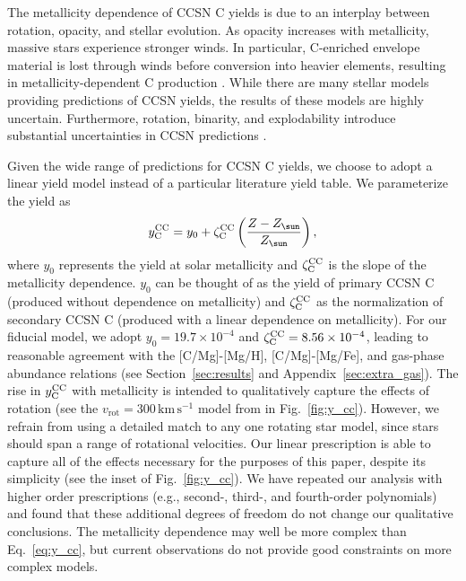 \documentclass[fleqn,
usenatbib]{mnras}
\newcommand{\caah}{[C/Mg]-[Mg/H]}
\newcommand{\caafe}{[C/Mg]-[Mg/Fe]}
\newcommand{\Ycc}{{y_{\rm C}^{\rm CC}}}
\newcommand{\yo}{y_0}
\newcommand{\zcc}{\zeta_{\rm C}^{\rm CC}}
\newcommand{\Zo}{ Z_{\sun}}
\begin{document}
The metallicity dependence of CCSN C yields is due to an interplay between rotation, opacity, and stellar evolution. As opacity increases with metallicity, massive stars experience stronger winds. In particular, C-enriched envelope material is lost through winds before conversion into heavier elements, resulting in metallicity-dependent C production \citep{LC18}.
While there are many stellar models providing predictions of CCSN yields, the results of these models are highly uncertain. Furthermore, rotation, binarity, and explodability introduce substantial uncertainties in CCSN predictions \citep{farmer+21}.

Given the wide range of predictions for CCSN C yields, we choose to adopt a linear yield model instead of a particular literature yield table. We parameterize the yield as
\begin{equation}\label{eq:y_cc}
    \Ycc =  \yo + \zcc \left(\frac{Z - \Zo}{\Zo}\right),
\end{equation}
where $\yo$ represents the yield at solar metallicity and $\zcc$ is the slope of the metallicity dependence. 
$\yo$ can be thought of as the yield of primary CCSN C (produced without dependence on metallicity) and $\zcc$ as the normalization of secondary CCSN C (produced with a linear dependence on metallicity). 
For our fiducial model, we adopt $\yo = {19.7}\times 10^{-4}$ and $\zcc = {8.56} \times 10^{-4}$, leading to reasonable agreement with the \caah{}, \caafe{}, and gas-phase abundance relations (see Section~\ref{sec:results} and Appendix~\ref{sec:extra_gas}). The rise in $\Ycc$ with metallicity is intended to qualitatively capture the effects of rotation (see the $v_\text{rot}=300\,\text{km}\,\text{s}^{-1}$ model from \citealt{LC18} in Fig.~\ref{fig:y_cc}). However, we refrain from using a detailed match to any one rotating star model, since stars should span a range of rotational velocities.
Our linear prescription is able to capture all of the effects necessary for the purposes of this paper, despite its simplicity (see the inset of Fig.~\ref{fig:y_cc}). We have repeated our analysis with higher order prescriptions (e.g., second-, third-, and fourth-order polynomials) and found that these additional degrees of freedom do not change our qualitative conclusions. The metallicity dependence may well be more complex than Eq.~\ref{eq:y_cc}, but current observations do not provide good constraints on more complex models.  
\end{document}
